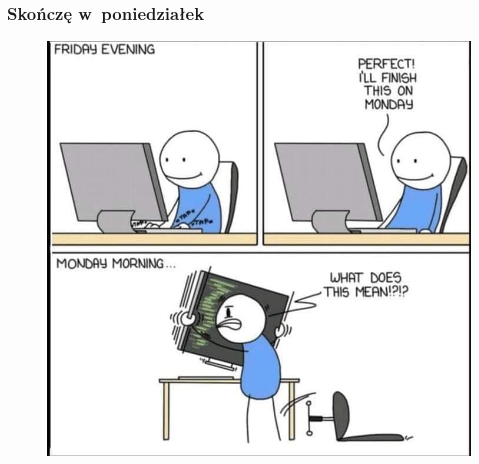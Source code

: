 \documentclass[10pt,t]{beamer}
\begin{document}
\begin{frame}
  \frametitle{Skończę w~poniedziałek}


  \begin{figure}

    \centering


    \includegraphics[scale=0.28]
    {./PresentationsPictures/I-will-finish-it-on-Monday.jpg}

  \end{figure}

\end{frame}
\end{document}
